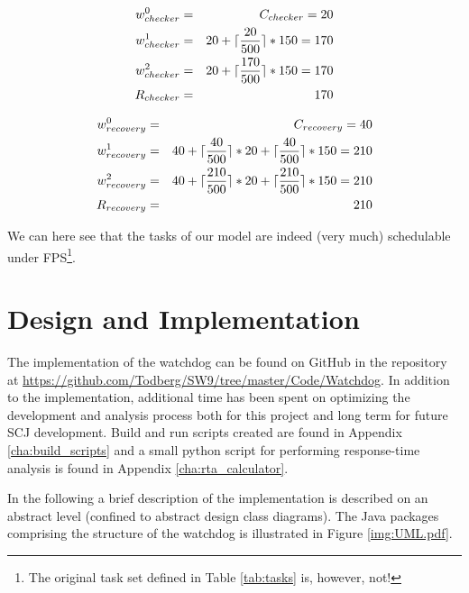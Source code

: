 \begin{eqnarray}
    w_{checker}^0 &=& C_{checker} = 20 \nonumber \\ 
    w_{checker}^1 &=& 20 + \lceil\frac{20}{500}\rceil*150 = 170 \nonumber \\ 
    w_{checker}^2 &=& 20 + \lceil\frac{170}{500}\rceil*150 = 170 \nonumber \\
    R_{checker} &=& 170
\end{eqnarray}

\begin{eqnarray}
    w_{recovery}^0 &=& C_{recovery} = 40 \nonumber \\ 
    w_{recovery}^1 &=& 40 + \lceil\frac{40}{500}\rceil*20 + \lceil\frac{40}{500}\rceil*150 = 210 \nonumber \\ 
    w_{recovery}^2 &=& 40 + \lceil\frac{210}{500}\rceil*20 + \lceil\frac{210}{500}\rceil*150 = 210 \nonumber \\
    R_{recovery} &=& 210
\end{eqnarray}

We can here see that the tasks of our model are indeed (very much) schedulable under FPS\footnote{The original task set defined in Table \ref{tab:tasks} is, however, not!}.

\chapter{Design and Implementation}
The implementation of the watchdog can be found on GitHub in the repository at \url{https://github.com/Todberg/SW9/tree/master/Code/Watchdog}. In addition to the implementation, additional time has been spent on optimizing the development and analysis process both for this project and long term for future SCJ development. Build and run scripts created are found in Appendix \ref{cha:build_scripts} and a small python script for performing response-time analysis is found in Appendix \ref{cha:rta_calculator}.

In the following a brief description of the implementation is described on an abstract level (confined to abstract design class diagrams). The Java packages comprising the structure of the watchdog is illustrated in Figure \ref{img:UML.pdf}. 

